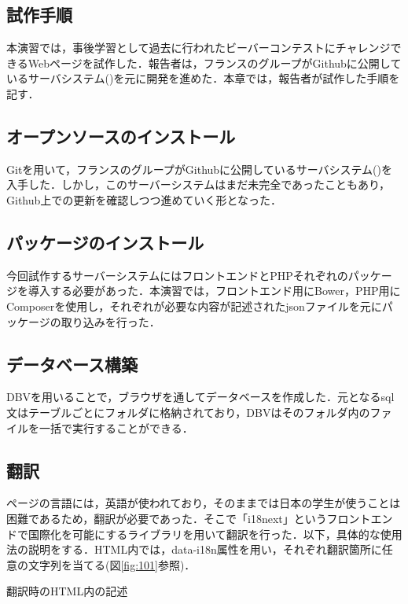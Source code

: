 \documentclass[a4paper]{jarticle}
\makeatletter
\newenvironment{figurehere}
  {\def\@captype{figure}}
  {}
\makeatother
\begin{document}
\begin{multicols}{2}
\section{試作手順}
本演習では，事後学習として過去に行われたビーバーコンテストにチャレンジできるWebページを試作した．報告者は，フランスのグループがGithubに公開しているサーバシステム(\cite{bebras-france-platform})を元に開発を進めた．本章では，報告者が試作した手順を記す．
\subsection{オープンソースのインストール}
Gitを用いて，フランスのグループがGithubに公開しているサーバシステム(\cite{bebras-france-platform})を入手した．しかし，このサーバーシステムはまだ未完全であったこともあり，Github上での更新を確認しつつ進めていく形となった．

\subsection{パッケージのインストール}
今回試作するサーバーシステムにはフロントエンドとPHPそれぞれのパッケージを導入する必要があった．本演習では，フロントエンド用にBower，PHP用にComposerを使用し，それぞれが必要な内容が記述されたjsonファイルを元にパッケージの取り込みを行った．

\subsection{データベース構築}
DBVを用いることで，ブラウザを通してデータベースを作成した．元となるsql文はテーブルごとにフォルダに格納されており，DBVはそのフォルダ内のファイルを一括で実行することができる．

\subsection{翻訳}
ページの言語には，英語が使われており，そのままでは日本の学生が使うことは困難であるため，翻訳が必要であった．そこで「i18next」というフロントエンドで国際化を可能にするライブラリを用いて翻訳を行った．以下，具体的な使用法の説明をする．HTML内では，data-i18n属性を用い，それぞれ翻訳箇所に任意の文字列を当てる(図\ref{fig:101}参照)．

\begin{figurehere}
\begin{center}
\end{center}
\caption{翻訳時のHTML内の記述}\label{fig:101}
\end{figurehere}


\end{multicols}
\end{document}
